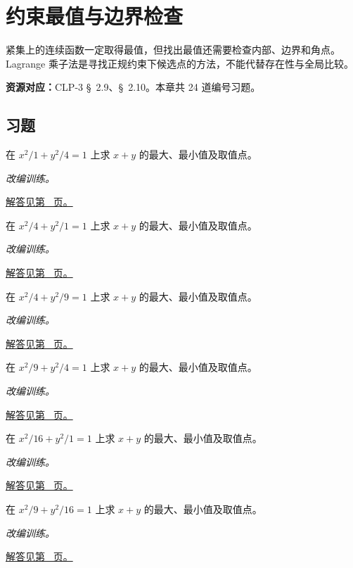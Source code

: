 \documentclass[UTF8,12pt,a4paper,fontset=fandol]{ctexart}
\begin{document}
\clearpage
\section{约束最值与边界检查}\label{sec:ch35}
紧集上的连续函数一定取得最值，但找出最值还需要检查内部、边界和角点。Lagrange 乘子法是寻找正规约束下候选点的方法，不能代替存在性与全局比较。

\textbf{资源对应：}CLP-3 \S~2.9、\S~2.10。本章共 24 道编号习题。
\subsection{习题}
\begin{example}[椭圆上的线性函数最值]\label{ex:c35q1}
在 $x^2/1+y^2/4=1$ 上求 $x+y$ 的最大、最小值及取值点。
\par\textit{改编训练。}\par\hyperref[ans:c35q1]{解答见第~\pageref{ans:c35q1} 页。}
\end{example}
\begin{example}[椭圆上的线性函数最值]\label{ex:c35q2}
在 $x^2/4+y^2/1=1$ 上求 $x+y$ 的最大、最小值及取值点。
\par\textit{改编训练。}\par\hyperref[ans:c35q2]{解答见第~\pageref{ans:c35q2} 页。}
\end{example}
\begin{example}[椭圆上的线性函数最值]\label{ex:c35q3}
在 $x^2/4+y^2/9=1$ 上求 $x+y$ 的最大、最小值及取值点。
\par\textit{改编训练。}\par\hyperref[ans:c35q3]{解答见第~\pageref{ans:c35q3} 页。}
\end{example}
\begin{example}[椭圆上的线性函数最值]\label{ex:c35q4}
在 $x^2/9+y^2/4=1$ 上求 $x+y$ 的最大、最小值及取值点。
\par\textit{改编训练。}\par\hyperref[ans:c35q4]{解答见第~\pageref{ans:c35q4} 页。}
\end{example}
\begin{example}[椭圆上的线性函数最值]\label{ex:c35q5}
在 $x^2/16+y^2/1=1$ 上求 $x+y$ 的最大、最小值及取值点。
\par\textit{改编训练。}\par\hyperref[ans:c35q5]{解答见第~\pageref{ans:c35q5} 页。}
\end{example}
\begin{example}[椭圆上的线性函数最值]\label{ex:c35q6}
在 $x^2/9+y^2/16=1$ 上求 $x+y$ 的最大、最小值及取值点。
\par\textit{改编训练。}\par\hyperref[ans:c35q6]{解答见第~\pageref{ans:c35q6} 页。}
\end{example}
\end{document}
